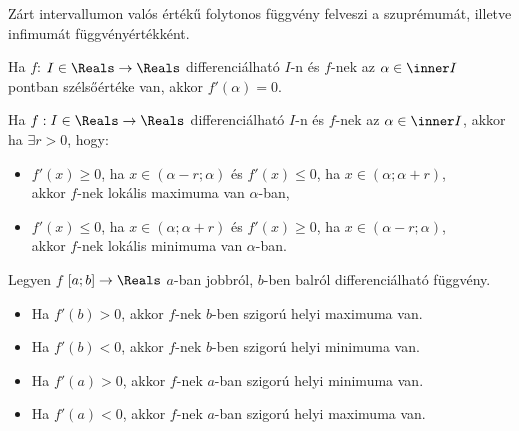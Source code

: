 \begin{note}
  Zárt intervallumon valós értékű folytonos függvény felveszi a szuprémumát,
  illetve infimumát függvényértékként.
\end{note}

\begin{theorem}
  Ha $f$: $I\in\Reals \rightarrow \Reals $ differenciálható $I$-n és $f$-nek az
  $\alpha \in \inner I$ pontban szélsőértéke van, akkor $f'(\alpha)=0$.
\end{theorem}

\begin{theorem}
  Ha $f: I \in\Reals \rightarrow \Reals $ differenciálható $I$-n és $f$-nek az
  $\alpha \in \inner I$, akkor ha $\exists r>0$, hogy:
  \begin{itemize}
    \item $f'(x)\geq0$, ha $x\in (\alpha-r;\alpha)$ és
          $f'(x)\leq0$, ha $x\in (\alpha;\alpha+r)$,\\
          akkor $f$-nek lokális maximuma van $\alpha$-ban,
    \item $f'(x)\leq0$, ha $x\in (\alpha;\alpha+r)$
          és $f'(x)\geq0$, ha $x\in (\alpha-r;\alpha)$,\\
          akkor $f$-nek lokális minimuma van $\alpha$-ban.
  \end{itemize}
\end{theorem}

\begin{theorem}
  Legyen $f$ $[a; b] \rightarrow \Reals$ $a$-ban jobbról, $b$-ben balról
  differenciálható függvény.
  \begin{itemize}
    \item Ha $f'(b)>0$, akkor $f$-nek $b$-ben szigorú helyi maximuma van.
    \item Ha $f'(b)<0$, akkor $f$-nek $b$-ben szigorú helyi minimuma van.
    \item Ha $f'(a)>0$, akkor $f$-nek $a$-ban szigorú helyi minimuma van.
    \item Ha $f'(a)<0$, akkor $f$-nek $a$-ban szigorú helyi maximuma van.
  \end{itemize}
\end{theorem}

